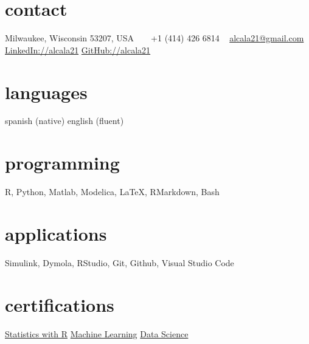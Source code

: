 \documentclass[]{friggeri-cv} %
\begin{document}


\begin{aside} %
\section{contact}
Milwaukee, Wisconsin 53207, USA
~
\Mobilefone~ +1 (414) 426 6814
~
\href{mailto:alcala21@gmail.com}{alcala21@gmail.com}
\href{https://www.linkedin.com/in/alcala21}{LinkedIn://alcala21}
\href{https://www.github.com/alcala21}{GitHub://alcala21}
\section{languages}
spanish (native)
english (fluent)
\section{programming}
R, Python, Matlab,
Modelica, \LaTeX,
RMarkdown, Bash
\section{applications}
Simulink, Dymola,
RStudio, Git, Github,
Visual Studio Code
\section{certifications}
\href{https://www.coursera.org/account/accomplishments/specialization/certificate/UWG3PS5EXMBJ}{Statistics with R}
\href{https://www.coursera.org/account/accomplishments/specialization/certificate/2VHFDHW5GUK6}{Machine Learning}
\href{https://www.coursera.org/account/accomplishments/specialization/certificate/W9DB45S3CGDZ}{Data Science}
\end{aside}

\end{document}
